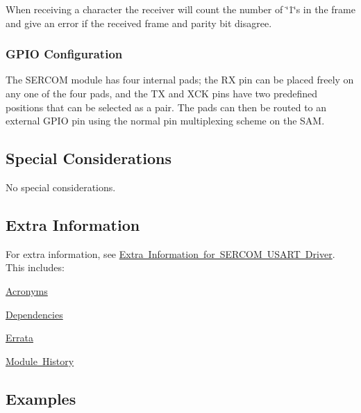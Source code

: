 When receiving a character the receiver will count the number of \char`\"{}1\char`\"{}s in the frame and give an error if the received frame and parity bit disagree.\hypertarget{group__asfdoc__sam0__sercom__usart__group_asfdoc_sam0_sercom_usart_overview_pin_configuration}{}\subsubsection{G\+P\+I\+O Configuration}\label{group__asfdoc__sam0__sercom__usart__group_asfdoc_sam0_sercom_usart_overview_pin_configuration}
The S\+E\+R\+C\+OM module has four internal pads; the RX pin can be placed freely on any one of the four pads, and the TX and X\+CK pins have two predefined positions that can be selected as a pair. The pads can then be routed to an external G\+P\+IO pin using the normal pin multiplexing scheme on the S\+AM.\hypertarget{group__asfdoc__sam0__sercom__usart__group_asfdoc_sam0_sercom_usart_special_considerations}{}\subsection{Special Considerations}\label{group__asfdoc__sam0__sercom__usart__group_asfdoc_sam0_sercom_usart_special_considerations}
No special considerations.\hypertarget{group__asfdoc__sam0__sercom__usart__group_asfdoc_sam0_sercom_usart_extra_info}{}\subsection{Extra Information}\label{group__asfdoc__sam0__sercom__usart__group_asfdoc_sam0_sercom_usart_extra_info}
For extra information, see \mbox{\hyperlink{asfdoc_sam0_sercom_usart_extra}{Extra Information for S\+E\+R\+C\+OM U\+S\+A\+RT Driver}}. This includes\+:
\begin{DoxyItemize}
\item \mbox{\hyperlink{asfdoc_sam0_sercom_usart_extra_asfdoc_sam0_sercom_usart_extra_acronyms}{Acronyms}}
\item \mbox{\hyperlink{asfdoc_sam0_sercom_usart_extra_asfdoc_sam0_sercom_usart_extra_dependencies}{Dependencies}}
\item \mbox{\hyperlink{asfdoc_sam0_sercom_usart_extra_asfdoc_sam0_sercom_usart_extra_errata}{Errata}}
\item \mbox{\hyperlink{asfdoc_sam0_sercom_usart_extra_asfdoc_sam0_sercom_usart_extra_history}{Module History}}
\end{DoxyItemize}\hypertarget{group__asfdoc__sam0__sercom__usart__group_asfdoc_sam0_sercom_usart_examples}{}\subsection{Examples}\label{group__asfdoc__sam0__sercom__usart__group_asfdoc_sam0_sercom_usart_examples}
